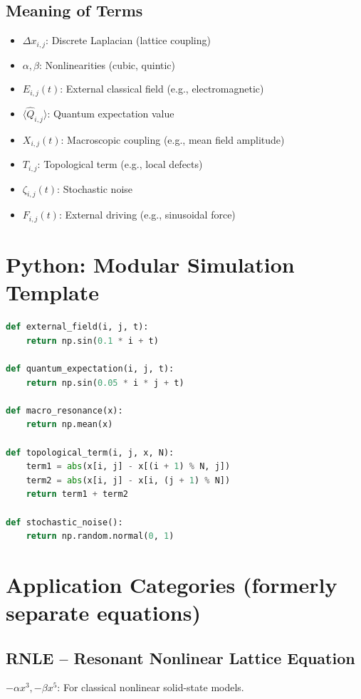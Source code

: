 \documentclass[12pt]{article}
\begin{document}
\subsection*{Meaning of Terms}
\begin{itemize}
\item $\Delta x_{i,j}$: Discrete Laplacian (lattice coupling)
\item $\alpha, \beta$: Nonlinearities (cubic, quintic)
\item $E_{i,j}(t)$: External classical field (e.g., electromagnetic)
\item $\langle \hat{Q}_{i,j} \rangle$: Quantum expectation value
\item $X_{i,j}(t)$: Macroscopic coupling (e.g., mean field amplitude)
\item $T_{i,j}$: Topological term (e.g., local defects)
\item $\zeta_{i,j}(t)$: Stochastic noise
\item $F_{i,j}(t)$: External driving (e.g., sinusoidal force)
\end{itemize}

\clearpage

\section*{Python: Modular Simulation Template}
\begin{lstlisting}[language=Python]
def external_field(i, j, t):
    return np.sin(0.1 * i + t)

def quantum_expectation(i, j, t):
    return np.sin(0.05 * i * j + t)

def macro_resonance(x):
    return np.mean(x)

def topological_term(i, j, x, N):
    term1 = abs(x[i, j] - x[(i + 1) % N, j])
    term2 = abs(x[i, j] - x[i, (j + 1) % N])
    return term1 + term2

def stochastic_noise():
    return np.random.normal(0, 1)
\end{lstlisting}

\clearpage

\section*{\small Application Categories (formerly separate equations)}

\subsection*{RNLE -- Resonant Nonlinear Lattice Equation}
$-\alpha x^3, -\beta x^5$: For classical nonlinear solid-state models.
\end{document}
